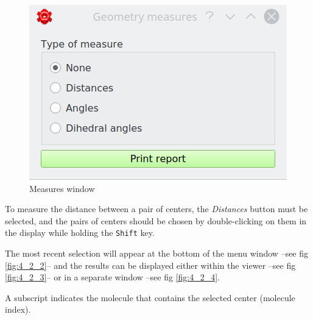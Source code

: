 \documentclass[10pt]{article}
\begin{document}
\begin{figure}[H]
\begin{center}
\includegraphics[width=0.3\linewidth]{damqt320_measures.png}
\end{center}
\caption{{Measures window}\label{fig:4_2_1}}
\end{figure}

To measure the distance between a pair of centers, the {\it Distances}  
button must be selected, and the pairs of centers should be chosen by double-clicking on them  
in the display while holding the \texttt{Shift} key.  

The most recent selection will appear at the bottom of the menu window --see fig \ref{fig:4_2_2}--  
and the results can be displayed either within the viewer --see fig \ref{fig:4_2_3}--  
or in a separate window --see fig \ref{fig:4_2_4}.  

A subscript indicates the molecule that contains the selected center  
(molecule index).  


\vspace*{0.5cm}
\end{document}
